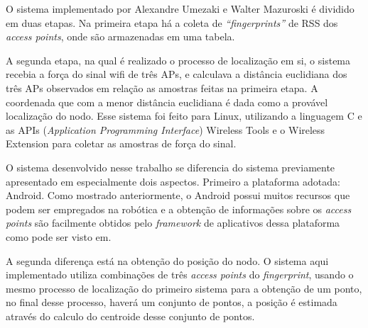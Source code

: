   O sistema implementado por Alexandre Umezaki e Walter Mazuroski é dividido em duas etapas. 
  Na primeira etapa há a coleta de \textit{``fingerprints''} de RSS dos \textit{access points}, onde são armazenadas em
  uma tabela.%
  
  A segunda etapa, na qual é realizado o processo de localização 
  em si, o sistema recebia a força do sinal wifi de três APs, e calculava a distância euclidiana dos 
  três APs observados em relação as amostras feitas na primeira etapa. A coordenada 
  que com a menor distância euclidiana é dada como a provável localização do nodo. 
  Esse sistema foi feito para Linux, utilizando a linguagem C
  e as APIs (\textit{Application Programming Interface}) Wireless Tools e o Wireless Extension\cite{apic}
 para coletar as amostras de força do sinal.
  
  O sistema desenvolvido nesse trabalho se diferencia do sistema previamente apresentado em
  especialmente dois aspectos. Primeiro a plataforma adotada: Android. Como mostrado anteriormente,
  o Android possui muitos recursos que podem ser empregados na robótica e a obtenção de informações 
  sobre os \textit{access points} são facilmente obtidos pelo \textit{framework} de aplicativos dessa plataforma como
  pode ser visto em\cite{getRss}.
  
  A segunda diferença está na obtenção do posição do nodo. O sistema aqui implementado utiliza 
  combinações de três \textit{access points} do \textit{fingerprint}, usando o mesmo 
  processo de localização do primeiro sistema para a obtenção de um ponto, no final desse processo, haverá 
  um conjunto de pontos, a posição é estimada através do calculo do centroide desse conjunto de pontos.
   
